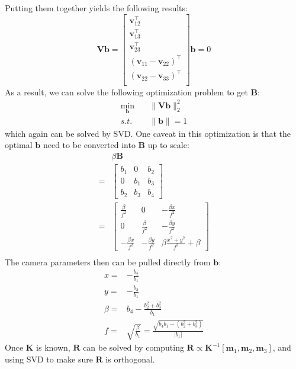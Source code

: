 \documentclass[10pt,twocolumn,letterpaper]{article}
\begin{document}
Putting them together yields the following results:
\begin{equation}
\mathbf{Vb}=\left [
\begin{array}{c}
\mathbf{v}_{12}^\top\\
\mathbf{v}_{13}^\top\\
\mathbf{v}_{23}^\top\\
(\mathbf{v}_{11}-\mathbf{v}_{22})^\top\\
(\mathbf{v}_{22}-\mathbf{v}_{33})^\top\\
\end{array}
\right ]\mathbf{b}=0
\end{equation}
As a result, we can solve the following optimization problem to get $\mathbf{B}$:
\begin{equation}
\begin{split}
\min_{\mathbf{b}}&\quad \|\mathbf{Vb}\|_2^2\\
s.t.&\quad \|\mathbf{b}\|=1
\end{split}
\end{equation}
which again can be solved by SVD. One caveat in this optimization is that the optimal $\mathbf{b}$ need to be converted into $\mathbf{B}$ up to scale:
\begin{equation}
\begin{split}
&\beta\mathbf{B}\\
=&\left [
\begin{array}{ccc}
b_1 & 0 & b_2 \\
0 & b_1 & b_3 \\
b_2 & b_3 & b_4
\end{array}
\right ]\\
=&\left [
\begin{array}{ccc}
\frac{\beta}{f^2} & 0 & -\frac{\beta x}{f^2} \\
0 & \frac{\beta}{f^2} & -\frac{\beta y}{f^2} \\
-\frac{\beta x}{f^2} & -\frac{\beta y}{f^2} & \beta\frac{x^2+y^2}{f^2} + \beta
\end{array}
\right ]\\
\end{split}
\end{equation}
The camera parameters then can be pulled directly from $\mathbf{b}$:
\begin{equation}
\begin{split}
x=&-\frac{b_2}{b_1}\\
y=&-\frac{b_3}{b_1}\\
\beta=&b_4-\frac{b_2^2+b_3^2}{b_1}\\
f=&\sqrt{\frac{\beta}{b_1}}=\frac{\sqrt{b_4b_1-(b_2^2+b_3^2)}}{|b_1|}
\end{split}
\end{equation}
Once $\mathbf{K}$ is known, $\mathbf{R}$ can be solved by computing $\mathbf{R}\propto\mathbf{K}^{-1}[\mathbf{m}_1,\mathbf{m}_2,\mathbf{m}_3]$, and using SVD to make sure $\mathbf{R}$ is orthogonal.
\end{document}
